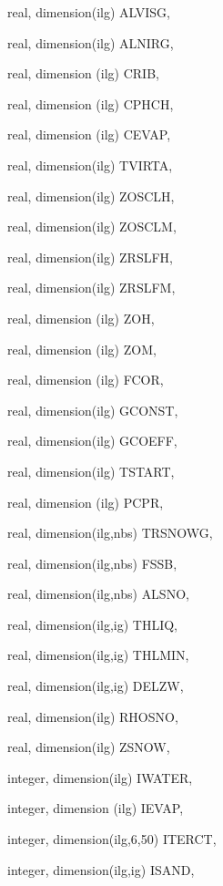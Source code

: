 {\begin{DoxyParamCaption}
\item[{real, dimension(ilg)}]{A\+L\+V\+I\+S\+G, }
\item[{real, dimension(ilg)}]{A\+L\+N\+I\+R\+G, }
\item[{real, dimension  (ilg)}]{C\+R\+I\+B, }
\item[{real, dimension (ilg)}]{C\+P\+H\+C\+H, }
\item[{real, dimension (ilg)}]{C\+E\+V\+A\+P, }
\item[{real, dimension(ilg)}]{T\+V\+I\+R\+T\+A, }
\item[{real, dimension(ilg)}]{Z\+O\+S\+C\+L\+H, }
\item[{real, dimension(ilg)}]{Z\+O\+S\+C\+L\+M, }
\item[{real, dimension(ilg)}]{Z\+R\+S\+L\+F\+H, }
\item[{real, dimension(ilg)}]{Z\+R\+S\+L\+F\+M, }
\item[{real, dimension   (ilg)}]{Z\+O\+H, }
\item[{real, dimension   (ilg)}]{Z\+O\+M, }
\item[{real, dimension  (ilg)}]{F\+C\+O\+R, }
\item[{real, dimension(ilg)}]{G\+C\+O\+N\+S\+T, }
\item[{real, dimension(ilg)}]{G\+C\+O\+E\+F\+F, }
\item[{real, dimension(ilg)}]{T\+S\+T\+A\+R\+T, }
\item[{real, dimension  (ilg)}]{P\+C\+P\+R, }
\item[{real, dimension(ilg,nbs)}]{T\+R\+S\+N\+O\+W\+G, }
\item[{real, dimension(ilg,nbs)}]{F\+S\+S\+B, }
\item[{real, dimension(ilg,nbs)}]{A\+L\+S\+N\+O, }
\item[{real, dimension(ilg,ig)}]{T\+H\+L\+I\+Q, }
\item[{real, dimension(ilg,ig)}]{T\+H\+L\+M\+I\+N, }
\item[{real, dimension(ilg,ig)}]{D\+E\+L\+Z\+W, }
\item[{real, dimension(ilg)}]{R\+H\+O\+S\+N\+O, }
\item[{real, dimension(ilg)}]{Z\+S\+N\+O\+W, }
\item[{integer, dimension(ilg)}]{I\+W\+A\+T\+E\+R, }
\item[{integer, dimension (ilg)}]{I\+E\+V\+A\+P, }
\item[{integer, dimension(ilg,6,50)}]{I\+T\+E\+R\+C\+T, }
\item[{integer, dimension(ilg,ig)}]{I\+S\+A\+N\+D, }

\end{DoxyParamCaption}}

